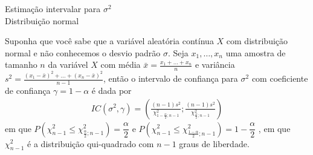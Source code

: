 \documentclass[8pt]{beamer}
\begin{document}
\begin{frame}{Estimação intervalar para $\sigma^2$\\ Distribuição normal}

\LARGE

Suponha que você sabe que a variável aleatória contínua $X$ com distribuição normal e não conhecemos o desvio padrão $\sigma$. Seja $x_1, \dots, x_n$ uma amostra de tamanho $n$ da variável $X$ com média $\bar{x} = \frac{x_1 + \dots + x_n}{n}$ e variância $s^2 = \frac{(x_1 - \bar{x})^2 + \dots + (x_n - \bar{x})^2}{n-1}$, então o intervalo de confiança para $\sigma^2$ com coeficiente de confiança $\gamma = 1-\alpha$ é dada por
\begin{align*}
IC(\sigma^2, \gamma) = \left( \frac{(n-1)s^2}{\chi^2_{1-\frac{\alpha}{2}; n-1}}; \frac{(n-1)s^2}{\chi^2_{\frac{\alpha}{2}; n-1}} \right)
\end{align*}
em que $P\left( \chi^2_{n-1} \leq \chi^2_{\frac{\alpha}{2}; n-1} \right) =  \dfrac{\alpha}{2}$ e $P\left( \chi^2_{n-1} \leq \chi^2_{\frac{1 - \alpha}{2}; n-1} \right) = 1 - \dfrac{\alpha}{2}$ , em que $\chi^2_{n-1}$ é a distribuição qui-quadrado com $n-1$ graus de liberdade.

\normalsize
\end{frame}
\end{document}
